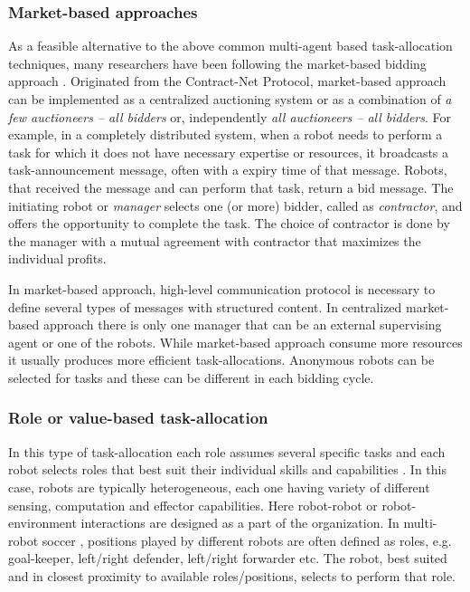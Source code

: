 \subsubsection*{Market-based approaches}
As a feasible alternative to the above common multi-agent based task-allocation techniques, many researchers have been following the market-based bidding approach . Originated from the Contract-Net Protocol, market-based approach can be implemented as a centralized auctioning system or as a combination of {\em a few auctioneers -- all bidders} or, independently {\em all auctioneers -- all bidders}. For example, in a completely distributed system, when a robot needs to perform a task for which it does not have necessary expertise or resources, it broadcasts a task-announcement message, often with  a expiry time of that message. Robots, that received the message and can perform that task, return a bid message. The initiating robot or {\em  manager} selects one (or more) bidder, called as {\em contractor}, and offers the opportunity to complete the task. The choice of contractor is done by the manager with a mutual agreement with contractor that maximizes the individual profits. 

In market-based approach, high-level communication protocol is necessary to define several types of messages with structured content. In centralized market-based approach there is only one manager that can be an external supervising agent or  one of the robots. While market-based approach consume more resources it usually produces more efficient task-allocations. Anonymous robots can be selected for tasks and these can be different in each bidding cycle.
%
\subsubsection*{Role or value-based task-allocation}
In this type of task-allocation each role assumes several specific tasks and each robot selects roles that best suit their individual skills and capabilities \cite{Chaimowicz2002}. In this case, robots are typically heterogeneous, each one having variety of different sensing, computation and effector capabilities. Here robot-robot or robot-environment interactions are designed as a part of the organization. In multi-robot soccer \cite{Stone+1999}, positions played by different  robots are often defined as roles, e.g. goal-keeper, left/right defender, left/right forwarder etc. The robot, best suited and in closest proximity to available roles/positions, selects to perform that role.
